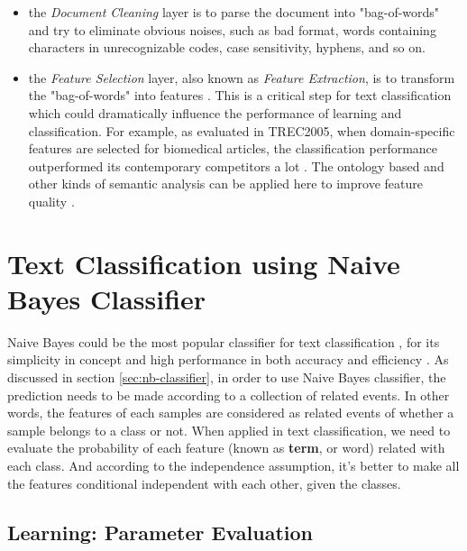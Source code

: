 \documentclass{article}
\begin{document}
\begin{itemize}
	\item the \textit{Document Cleaning} layer \cite{document-cleaning} is to parse the document into "bag-of-words" and try to eliminate obvious noises, such as bad format, words containing characters in unrecognizable codes, case sensitivity, hyphens, and so on.
	\item the \textit{Feature Selection} layer, also known as \textit{Feature Extraction}, is to transform the "bag-of-words" into features \cite{feature-selection-and-extraction}. This is a critical step for text classification which could dramatically influence the performance of learning and classification. For example, as evaluated in TREC2005, when domain-specific features are selected for biomedical articles, the classification performance outperformed its contemporary competitors a lot \cite{wim2005}. The ontology based and other kinds of semantic analysis can be applied here to improve feature quality \cite{vicient2013automatic, wang2003comparative}.
\end{itemize}

\section{Text Classification using Naive Bayes Classifier}

Naive Bayes could be the most popular classifier for text classification \cite{kim2006some, mccallum1998comparison, chen2009feature, dai2007transferring}, for its simplicity in concept and high performance in both accuracy and efficiency \cite{is-nb-good}. As discussed in section \ref{sec:nb-classifier}, in order to use Naive Bayes classifier, the prediction needs to be made according to a collection of related events. In other words, the features of each samples are considered as related events of whether a sample belongs to a class or not. When applied in text classification, we need to evaluate the probability of each feature (known as \textbf{term}, or word) related with each class. And according to the independence assumption, it's better to make all the features conditional independent with each other, given the classes. 

\subsection{Learning: Parameter Evaluation}
\end{document}

